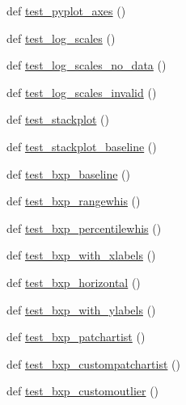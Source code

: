 \begin{DoxyCompactItemize}
\item 
def \hyperlink{namespacematplotlib_1_1tests_1_1test__axes_ab9addcf07199e635a3d7b005a20927e5}{test\+\_\+pyplot\+\_\+axes} ()
\item 
def \hyperlink{namespacematplotlib_1_1tests_1_1test__axes_a9c551042416c6f3c0ff186f2430ad6c8}{test\+\_\+log\+\_\+scales} ()
\item 
def \hyperlink{namespacematplotlib_1_1tests_1_1test__axes_afee1f43361325313611846ebd11d2472}{test\+\_\+log\+\_\+scales\+\_\+no\+\_\+data} ()
\item 
def \hyperlink{namespacematplotlib_1_1tests_1_1test__axes_af9a661b741f5e1f41aaa8b8edbb8d259}{test\+\_\+log\+\_\+scales\+\_\+invalid} ()
\item 
def \hyperlink{namespacematplotlib_1_1tests_1_1test__axes_a884309bd759694d57e74c7cef129a011}{test\+\_\+stackplot} ()
\item 
def \hyperlink{namespacematplotlib_1_1tests_1_1test__axes_a41d1f1b244ea39aafc117ca385e13a93}{test\+\_\+stackplot\+\_\+baseline} ()
\item 
def \hyperlink{namespacematplotlib_1_1tests_1_1test__axes_a32fd59d29ecdea8425f8ed97227a2ade}{test\+\_\+bxp\+\_\+baseline} ()
\item 
def \hyperlink{namespacematplotlib_1_1tests_1_1test__axes_a8149b1adaca7ebfe05ad0ee97c17026c}{test\+\_\+bxp\+\_\+rangewhis} ()
\item 
def \hyperlink{namespacematplotlib_1_1tests_1_1test__axes_afcb323901f0c150c3446e362d15039ac}{test\+\_\+bxp\+\_\+percentilewhis} ()
\item 
def \hyperlink{namespacematplotlib_1_1tests_1_1test__axes_af3b29b0bbb522557038a842bf72ee4f3}{test\+\_\+bxp\+\_\+with\+\_\+xlabels} ()
\item 
def \hyperlink{namespacematplotlib_1_1tests_1_1test__axes_ab2f06b371efa13afd78587bb5bacd4bf}{test\+\_\+bxp\+\_\+horizontal} ()
\item 
def \hyperlink{namespacematplotlib_1_1tests_1_1test__axes_af5082e1c681ecb2a9c44c26d9716bcd3}{test\+\_\+bxp\+\_\+with\+\_\+ylabels} ()
\item 
def \hyperlink{namespacematplotlib_1_1tests_1_1test__axes_a0acfa19c7d03d6a1ee25250d26a55176}{test\+\_\+bxp\+\_\+patchartist} ()
\item 
def \hyperlink{namespacematplotlib_1_1tests_1_1test__axes_a776e024bf6f16648cb8cbb1a8da9f83b}{test\+\_\+bxp\+\_\+custompatchartist} ()
\item 
def \hyperlink{namespacematplotlib_1_1tests_1_1test__axes_a8524d5fa0127315671ff5318da946a50}{test\+\_\+bxp\+\_\+customoutlier} ()

\end{DoxyCompactItemize}
